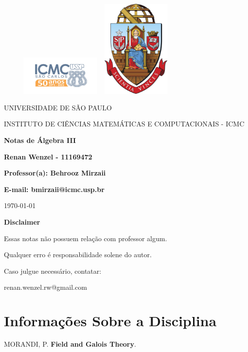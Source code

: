 \documentclass[12pt]{article}
\theoremstyle{definition}
\begin{document}
\begin{figure}[ht]
	\includegraphics[width=4cm]{../icmc.png}
	\hspace{7cm}
	\includegraphics[height=4.9cm,width=4cm]{../brasao_usp_cor.jpg}
	\endminipage
\end{figure}

\begin{center}
	\vspace{1cm}
	\LARGE
	UNIVERSIDADE DE SÃO PAULO

	\vspace{1.3cm}
	\LARGE
	INSTITUTO DE CIÊNCIAS MATEMÁTICAS E COMPUTACIONAIS - ICMC

	\vspace{1.7cm}
	\Large
	\textbf{Notas de Álgebra III}

	\vspace{1.3cm}
	\large
	\textbf{Renan Wenzel - 11169472}

	\vspace{1.3cm}
	\large
	\textbf{Professor(a): Behrooz Mirzaii}

	\textbf{E-mail: bmirzaii@icmc.usp.br}

	\vspace{1.3cm}
	\today
\end{center}

\newpage
\textbf{{\Huge Disclaimer}}

{\huge Essas notas não possuem relação com professor algum.

	Qualquer erro é responsabilidade solene do autor.

	Caso julgue necessário, contatar:

	renan.wenzel.rw@gmail.com}
\tableofcontents

\newpage

\section{Informações Sobre a Disciplina}


\newpage

\newpage

\begin{thebibliography}{99}
	 MORANDI, P. \textbf{Field and Galois Theory}.
\end{thebibliography}
\end{document}
